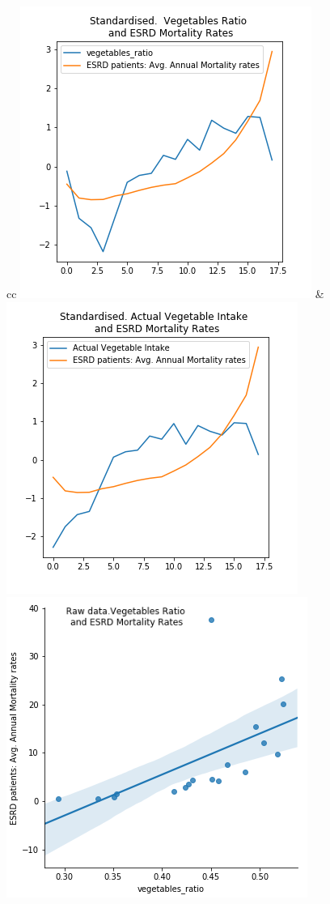 \begin{figure}
\small
\begin{tabular}{cc}	
	\includegraphics[scale=0.25]{./images/standard_vegetable_ratio.png} & 
	\includegraphics[scale=0.25]{./images/standard_actual_vegetable_intake_esrd_mortality.png}\\
	 { \includegraphics[scale=0.25]{./images/pairplot_vegetable_.png}} 	  \\

\end{tabular}
\end{figure}
